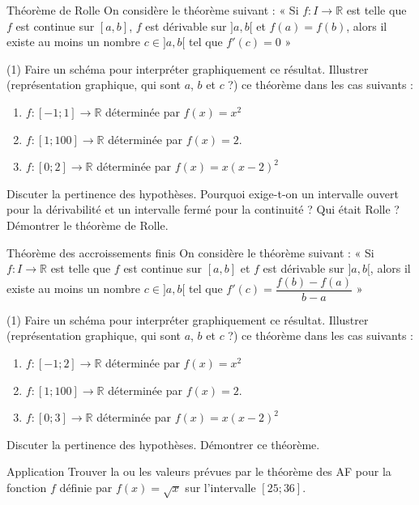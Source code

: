 \documentclass[a4paper,12pt]{article}
\begin{document}
\begin{activite}{Théorème de Rolle}
\tcblower
On considère le théorème suivant : « Si $f: I \to \mathbb{R}$ est telle que $f$ est continue sur $[a,b]$, $f$ est dérivable sur $]a,b[$ et $f(a) = f(b)$, alors il existe au moins un nombre $c \in ]a,b[$ tel que $f'(c) = 0$ »

\begin{tasks}(1)
\task Faire un schéma pour interpréter graphiquement ce résultat.
\task Illustrer (représentation graphique, qui sont $a$, $b$ et $c$ ?) ce théorème dans les cas suivants :
\begin{enumerate}
\item $f:[-1;1] \to \mathbb{R}$ déterminée par $f(x) = x^2$
\item $f:[1;100] \to \mathbb{R}$ déterminée par $f(x) = 2$.
\item $f:[0;2] \to \mathbb{R}$ déterminée par $f(x) = x(x-2)^2$
\end{enumerate}
\task Discuter la pertinence des hypothèses.
\task * Pourquoi exige-t-on un intervalle ouvert pour la dérivabilité et un intervalle fermé pour la continuité ?
\task * Qui était Rolle ?
\task Démontrer le théorème de Rolle.
\end{tasks}
\end{activite}
\begin{activite}{Théorème des accroissements finis}
\tcblower
On considère le théorème suivant : « Si $f: I \to \mathbb{R}$ est telle que $f$ est continue sur $[a,b]$ et $f$ est dérivable sur $]a,b[$, alors il existe au moins un nombre $c \in ]a,b[$ tel que $f'(c) = \dfrac{f(b) - f(a)}{b - a}$ »

\begin{tasks}(1)
\task Faire un schéma pour interpréter graphiquement ce résultat.
\task Illustrer (représentation graphique, qui sont $a$, $b$ et $c$ ?) ce théorème dans les cas suivants :
\begin{enumerate}
\item $f:[-1;2] \to \mathbb{R}$ déterminée par $f(x) = x^2$
\item $f:[1;100] \to \mathbb{R}$ déterminée par $f(x) = 2$.
\item $f:[0;3] \to \mathbb{R}$ déterminée par $f(x) = x(x-2)^2$
\end{enumerate}
\task Discuter la pertinence des hypothèses.
\task Démontrer ce théorème.
\end{tasks}
\end{activite}
\begin{activite}{Application}
\tcblower
Trouver la ou les valeurs prévues par le théorème des AF pour la fonction $f$ définie par $f(x) = \sqrt{x}$ sur l'intervalle $[25;36]$.
\end{activite}
\end{document}
